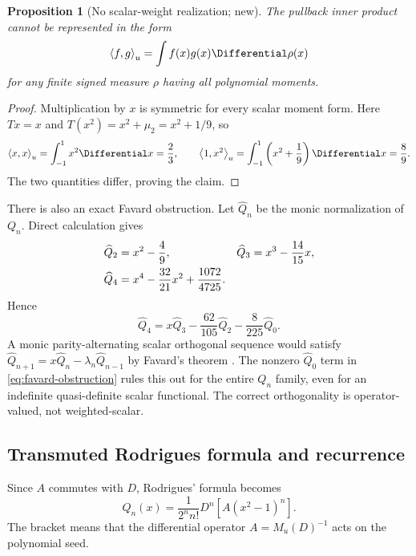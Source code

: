 \documentclass[11pt,oneside]{article}
\numberwithin{equation}{section}
\newtheorem{proposition}[theorem]{Proposition}
\theoremstyle{definition}
\theoremstyle{remark}
\newcommand{\M}{M_u}
\newcommand{\inner}[2]{\left\langle #1,#2\right\rangle}
\begin{document}
\begin{proposition}[No scalar-weight realization; new]
\label{prop:no-scalar-weight}
The pullback inner product cannot be represented in the form
\[
 \inner{f}{g}_u=\int f(x)g(x)\Differential\rho(x)
\]
for any finite signed measure $\rho$ having all polynomial moments.
\end{proposition}

\begin{proof}
Multiplication by $x$ is symmetric for every scalar moment form.  Here
$Tx=x$ and $T(x^2)=x^2+\mu_2=x^2+1/9$, so
\[
 \inner{x}{x}_u=\int_{-1}^{1}x^2\Differential x=\frac23,
 \qquad
 \inner{1}{x^2}_u=\int_{-1}^{1}\left(x^2+\frac19\right)\Differential x=\frac89.
\]
The two quantities differ, proving the claim.
\end{proof}

There is also an exact Favard obstruction.  Let $\widehat Q_n$ be the monic
normalization of $Q_n$.  Direct calculation gives
\begin{align}
 \widehat Q_2&=x^2-\frac49,
 &\widehat Q_3&=x^3-\frac{14}{15}x,\notag\\
 \widehat Q_4&=x^4-\frac{32}{21}x^2+\frac{1072}{4725}.
 \label{eq:monic-Q}
\end{align}
Hence
\begin{equation}
 \boxed{
 \widehat Q_4=x\widehat Q_3-\frac{62}{105}\widehat Q_2
 -\frac{8}{225}\widehat Q_0.}
 \label{eq:favard-obstruction}
\end{equation}
A monic parity-alternating scalar orthogonal sequence would satisfy
$\widehat Q_{n+1}=x\widehat Q_n-\lambda_n\widehat Q_{n-1}$ by Favard's
theorem \cite{Szego}.  The nonzero $\widehat Q_0$ term in
\eqref{eq:favard-obstruction} rules this out for the entire $Q_n$ family,
even for an indefinite quasi-definite scalar functional.  The correct
orthogonality is operator-valued, not weighted-scalar.

\subsection{Transmuted Rodrigues formula and recurrence}

Since $A$ commutes with $D$, Rodrigues' formula becomes
\begin{equation}
 Q_n(x)=\frac1{2^nn!}D^n\left[A(x^2-1)^n\right].
 \label{eq:Q-Rodrigues}
\end{equation}
The bracket means that the differential operator $A=\M(D)^{-1}$ acts on the
polynomial seed.
\end{document}
